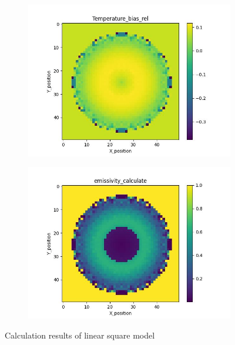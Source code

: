 \begin{figure}[htbp]
\begin{minipage}{\textwidth}
\begin{subfigure}{0.49\textwidth}
        \end{subfigure}
    \end{minipage}\\
    \begin{minipage}{\textwidth}
        \centering
        \begin{subfigure}{0.49\textwidth}
            \centering
            \includegraphics[width=\textwidth]{figures/raw_data/31/lin_square/T_bias.jpg}
        \end{subfigure}
        \begin{subfigure}{0.49\textwidth}
            \centering
            \includegraphics[width=\textwidth]{figures/raw_data/31/lin_square/emi_cal.jpg}
        \end{subfigure}
    \end{minipage}
    \caption{Calculation results of linear square model}
    \label{fig: result_linear_square_model}
\end{figure}

